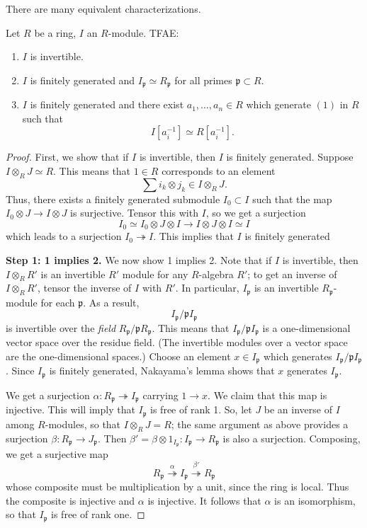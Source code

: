 There are many equivalent characterizations.

\begin{proposition} 
Let $R$ be a ring, $I$ an $R$-module. TFAE:
\begin{enumerate}
\item $I$ is invertible.   
\item $I$ is finitely generated and $I_{\mathfrak{p}} \simeq R_{\mathfrak{p}}$ for all primes
$\mathfrak{p} \subset R$.
\item $I$ is finitely generated and there exist $a_1, \dots, a_n \in R$ which generate $(1)$
in $R$ such that
\[ I[a_i^{-1}]\simeq R[a_i^{-1}].  \]
\end{enumerate}
\end{proposition} 
\begin{proof} 
First, we show that if $I$ is invertible, then $I$ is finitely generated. 
Suppose $I \otimes_R J \simeq R$. This means that $1 \in R$ corresponds to an
element
\[ \sum i_k \otimes j_k \in I \otimes_R J .  \]
Thus, there exists a finitely generated submodule $I_0\subset I$ such that the map $I_0 \otimes J \to I
\otimes J$ is surjective. Tensor this with $I$, so we get a surjection
\[ I_0 \simeq I_0 \otimes J \otimes I \to I \otimes J \otimes I \simeq I  \]
which leads to a surjection $I_0 \twoheadrightarrow I$. This implies that $I$
is finitely generated 

\textbf{Step 1: 1 implies 2.}
We now show 1 implies 2. Note that if $I$ is invertible, then $I \otimes_R R'$
is an invertible $R'$ module for any $R$-algebra $R'$; to get an inverse of
$I \otimes_R R'$,
tensor the inverse of $I$ with $R'$.
In particular, $I_{\mathfrak{p}}$ is an invertible $R_{\mathfrak{p}}$-module
for each $\mathfrak{p}$. As a result, 
\[ I_{\mathfrak{p}}/\mathfrak{p} I_{\mathfrak{p}}  \]
is invertible over the \emph{field} $R_{\mathfrak{p}}/\mathfrak{p}R_{\mathfrak{p}}$. This means
that 
$ I_{\mathfrak{p}}/\mathfrak{p} I_{\mathfrak{p}}$ is a one-dimensional vector
space over the residue field. (The invertible modules over a vector space are
the one-dimensional spaces.)
Choose an element $x \in I_{\mathfrak{p}}$ which generates
$I_{\mathfrak{p}}/\mathfrak{p}I_{\mathfrak{p}}$.  Since $I_{\mathfrak{p}}$ is
finitely generated, Nakayama's lemma shows that $x$ generates $I_{\mathfrak{p}}$.

We get a surjection $\alpha: R_{\mathfrak{p}} \twoheadrightarrow I_{\mathfrak{p}}$
carrying $1 \to x$.  We claim that this map is injective.
This will imply that $I_{\mathfrak{p}}$ is free of rank 1. So, let $J$ be an
inverse of $I$ among $R$-modules, so that $I \otimes_R J = R$; the same
argument as above provides a surjection
$ \beta: {R}_{\mathfrak{p}} \to J_{\mathfrak{p}}$. 
Then $\beta' = \beta \otimes 1_{I_{\mathfrak{p}}}: I_{\mathfrak{p}} \to
R_{\mathfrak{p}}$ is also a surjection.
Composing, we get a surjective map
\[ R_{\mathfrak{p}} \stackrel{\alpha}{\twoheadrightarrow} I_{\mathfrak{p}}
\stackrel{\beta'}{\twoheadrightarrow} R_{\mathfrak{p}}  \]
whose composite must be multiplication by a unit, since the ring is local. Thus
the composite is injective and $\alpha$ is injective. 
It follows that $\alpha$ is an isomorphism, so that $I_{\mathfrak{p}}$ is free
of rank one.


\end{proof}

